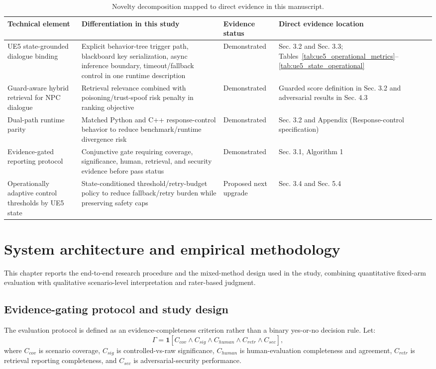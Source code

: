 ﻿\documentclass[a4paper,12pt]{article}
\newcommand{\ind}{\mathbf{1}}
\begin{document}
\begin{table}[t]
\centering
\caption{Novelty decomposition mapped to direct evidence in this manuscript.}
\label{tab:novelty_decomposition}
\begingroup
\footnotesize
\setlength{\tabcolsep}{3.5pt}
\begin{tabular}{p{}p{}p{}p{}}
\toprule
Technical element & Differentiation in this study & Evidence status & Direct evidence location \\
\midrule
UE5 state-grounded dialogue binding & Explicit behavior-tree trigger path, blackboard key serialization, async inference boundary, timeout/fallback control in one runtime description & Demonstrated & Sec. 3.2 and Sec. 3.3; Tables~\ref{tab:ue5_operational_metrics}--\ref{tab:ue5_state_operational} \\
Guard-aware hybrid retrieval for NPC dialogue & Retrieval relevance combined with poisoning/trust-spoof risk penalty in ranking objective & Demonstrated & Guarded score definition in Sec. 3.2 and adversarial results in Sec. 4.3 \\
Dual-path runtime parity & Matched Python and C++ response-control behavior to reduce benchmark/runtime divergence risk & Demonstrated & Sec. 3.2 and Appendix (Response-control specification) \\
Evidence-gated reporting protocol & Conjunctive gate requiring coverage, significance, human, retrieval, and security evidence before pass status & Demonstrated & Sec. 3.1, Algorithm 1 \\
Operationally adaptive control thresholds by UE5 state & State-conditioned threshold/retry-budget policy to reduce fallback/retry burden while preserving safety caps & Proposed next upgrade & Sec. 3.4 and Sec. 5.4 \\
\bottomrule
\end{tabular}
\endgroup
\end{table}

\section{System architecture and empirical methodology}
This chapter reports the end-to-end research procedure and the mixed-method design used in the study, combining quantitative fixed-arm evaluation with qualitative scenario-level interpretation and rater-based judgment.

\subsection{Evidence-gating protocol and study design}
The evaluation protocol is defined as an evidence-completeness criterion rather than a binary yes-or-no decision rule. Let:
\begin{equation}
\Gamma = \ind\!\left[C_{cov}\land C_{sig}\land C_{human}\land C_{retr}\land C_{sec}\right],
\end{equation}
where \(C_{cov}\) is scenario coverage, \(C_{sig}\) is controlled-vs-raw significance, \(C_{human}\) is human-evaluation completeness and agreement, \(C_{retr}\) is retrieval reporting completeness, and \(C_{sec}\) is adversarial-security performance.
\end{document}
